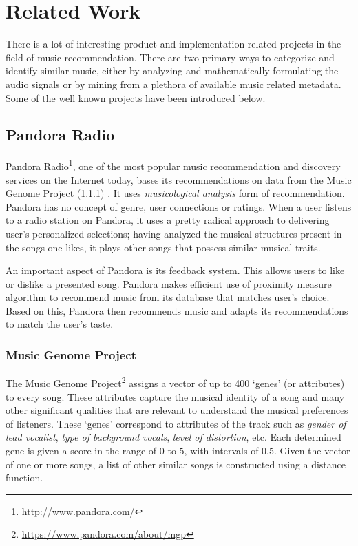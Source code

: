 \chapter{Related Work}
	There is a lot of interesting product and implementation related projects in the field of music recommendation. There are two primary ways to categorize and identify similar music, either by analyzing and mathematically formulating the audio signals or by mining from a plethora of available music related metadata. Some of the well known projects have been introduced below.

	\section{Pandora Radio}
		Pandora Radio\footnote{\url{http://www.pandora.com/}}, one of the most popular music recommendation and discovery services on the Internet today, bases its recommendations on data from the Music Genome Project (\ref{subsec:music_genome}) \cite{john2006pandora}. It uses \emph{musicological analysis} \cite{magno2008comparison} form of recommendation. Pandora has no concept of genre, user connections or ratings. When a user listens to a radio station on Pandora, it uses a pretty radical approach to delivering user’s personalized selections; having analyzed the musical structures present in the songs one likes, it plays other songs that possess similar musical traits.
		
		An important aspect of Pandora is its feedback system. This allows users to like or dislike a presented song. Pandora makes efficient use of proximity measure algorithm \cite{howepandora} to recommend music from its database that matches user’s choice. Based on this, Pandora then recommends music and adapts its recommendations to match the user’s taste.
		
		\subsection{Music Genome Project}
		\label{subsec:music_genome}
			The Music Genome Project\footnote{\url{https://www.pandora.com/about/mgp}} \cite{castelluccio2006music} assigns a vector of up to 400 `genes' (or attributes) to every song. These attributes capture the musical identity of a song and many other significant qualities that are relevant to understand the musical preferences of listeners. These `genes' correspond to attributes of the track such as \emph{gender of lead vocalist}, \emph{type of background vocals}, \emph{level of distortion}, etc. Each determined gene is given a score in the range of \(0\) to \(5\), with intervals of \(0.5\). Given the vector of one or more songs, a list of other similar songs is constructed using a distance function.
			
